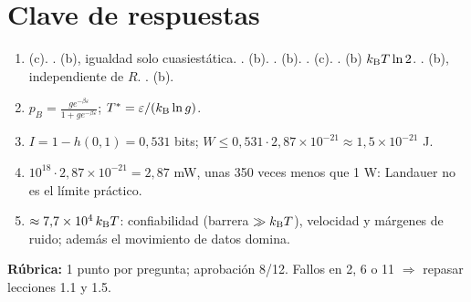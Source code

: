 \documentclass[11pt,a4paper]{article}
\begin{document}
\newpage
\section*{Clave de respuestas}
\begin{enumerate}
\item (c). . (b), igualdad solo cuasiestática. . (b). . (b). . (c). . (b) $k_{\mathrm B} T\ln2$. . (b), independiente de $R$. . (b).
\setcounter{enumi}{8}
\item $p_B=\frac{g e^{-\beta\varepsilon}}{1+g e^{-\beta\varepsilon}}$; $T^*=\varepsilon/(k_{\mathrm B}\ln g)$.
\item $I=1-h(0{,}1)=0{,}531$ bits; $W\le0{,}531\cdot2{,}87\times10^{-21}\approx1{,}5\times10^{-21}$ J.
\item $10^{18}\cdot2{,}87\times10^{-21}=2{,}87$ mW, unas 350 veces menos que 1 W: Landauer no es el límite práctico.
\item $\approx7{,}7\times10^4\,k_{\mathrm B} T$: confiabilidad (barrera $\gg k_{\mathrm B} T$), velocidad y márgenes de ruido; además el movimiento de datos domina.
\end{enumerate}
\noindent\textbf{Rúbrica:} 1 punto por pregunta; aprobación 8/12. Fallos en 2, 6 o 11 $\Rightarrow$ repasar lecciones 1.1 y 1.5.
\end{document}
